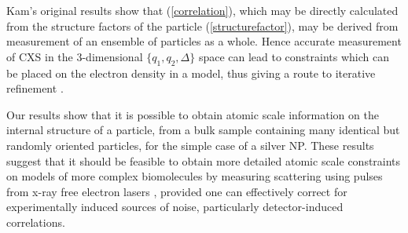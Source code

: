 \documentclass [11pt,fleqn]{article}
\begin{document}
Kam's original results \cite{Kam:1977wc} show that (\ref{correlation}), which may be directly calculated from the structure factors of the particle (\ref{structurefactor}), may be derived from measurement of an ensemble of particles as a whole. Hence accurate measurement of CXS in the 3-dimensional $\{q_1,q_2,\Delta\}$ space can lead to constraints which can be placed on the electron density in a model, thus giving a route to iterative refinement \cite{Schroder:2010cm}. 

Our results show that it is possible to obtain atomic scale information on the internal structure of a particle, from a bulk sample containing many identical  but randomly oriented particles, for the simple case of a silver NP. These results suggest that it should be feasible to obtain more detailed atomic scale constraints on models of more complex biomolecules by measuring scattering using pulses from x-ray free electron lasers \cite{Neutze:2000ih, Spence:2012eo}, provided one can effectively correct for experimentally induced sources of noise, particularly detector-induced correlations.
\end{document}
